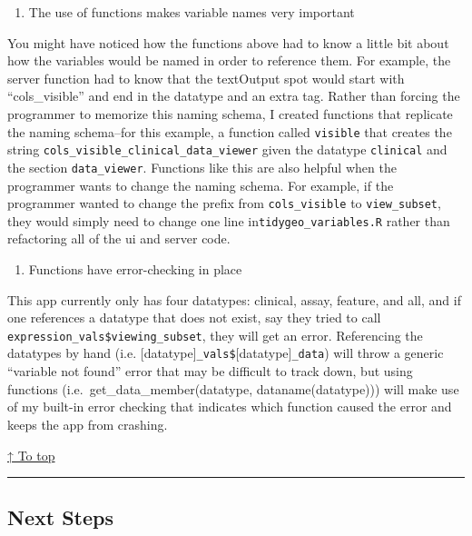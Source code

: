 \documentclass[]{article}
\providecommand{\tightlist}{%
  \setlength{\itemsep}{0pt}\setlength{\parskip}{0pt}}
\begin{document}
\begin{enumerate}
\def\labelenumi{\arabic{enumi}.}
\setcounter{enumi}{1}
\tightlist
\item
  The use of functions makes variable names very important
\end{enumerate}

You might have noticed how the functions above had to know a little bit
about how the variables would be named in order to reference them. For
example, the server function had to know that the textOutput spot would
start with ``cols\_visible'' and end in the datatype and an extra tag.
Rather than forcing the programmer to memorize this naming schema, I
created functions that replicate the naming schema--for this example, a
function called \texttt{visible} that creates the string
\texttt{cols\_visible\_clinical\_data\_viewer} given the datatype
\texttt{clinical} and the section \texttt{data\_viewer}. Functions like
this are also helpful when the programmer wants to change the naming
schema. For example, if the programmer wanted to change the prefix from
\texttt{cols\_visible} to \texttt{view\_subset}, they would simply need
to change one line in\texttt{tidygeo\_variables.R} rather than
refactoring all of the ui and server code.

\begin{enumerate}
\def\labelenumi{\arabic{enumi}.}
\setcounter{enumi}{2}
\tightlist
\item
  Functions have error-checking in place
\end{enumerate}

This app currently only has four datatypes: clinical, assay, feature,
and all, and if one references a datatype that does not exist, say they
tried to call \texttt{expression\_vals\$viewing\_subset}, they will get
an error. Referencing the datatypes by hand (i.e.
{[}datatype{]}\texttt{\_vals\$}{[}datatype{]}\texttt{\_data}) will throw
a generic ``variable not found'' error that may be difficult to track
down, but using functions (i.e.~get\_data\_member(datatype,
dataname(datatype))) will make use of my built-in error checking that
indicates which function caused the error and keeps the app from
crashing.

\protect\hyperlink{contents}{↑ To top}

\begin{center}\rule{0.5\linewidth}{\linethickness}\end{center}

\hypertarget{next-steps}{\subsection{Next Steps}\label{next-steps}}
\end{document}
